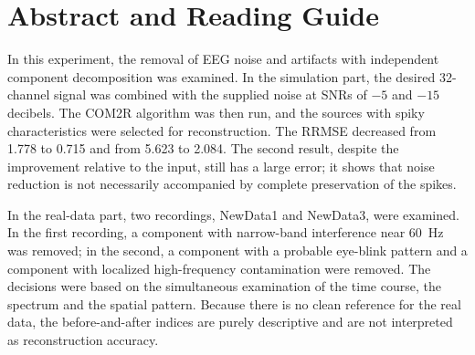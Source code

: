 \section*{Abstract and Reading Guide}

In this experiment, the removal of EEG noise and artifacts with independent component decomposition was examined. In the simulation part, the desired 32-channel signal was combined with the supplied noise at SNRs of $-5$ and $-15$ decibels. The COM2R algorithm was then run, and the sources with spiky characteristics were selected for reconstruction. The RRMSE decreased from 1.778 to 0.715 and from 5.623 to 2.084. The second result, despite the improvement relative to the input, still has a large error; it shows that noise reduction is not necessarily accompanied by complete preservation of the spikes.

In the real-data part, two recordings, NewData1 and NewData3, were examined. In the first recording, a component with narrow-band interference near 60~Hz was removed; in the second, a component with a probable eye-blink pattern and a component with localized high-frequency contamination were removed. The decisions were based on the simultaneous examination of the time course, the spectrum and the spatial pattern. Because there is no clean reference for the real data, the before-and-after indices are purely descriptive and are not interpreted as reconstruction accuracy.

\bigskip
\tableofcontents
\clearpage
